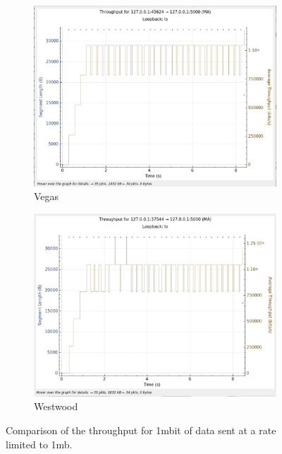 \documentclass{report}
\begin{document}
\begin{figure}[H]
    \begin{subfigure}[b]{0.45\textwidth}
        \centering
        \includegraphics[width=\textwidth]{Pics/Vegas/r1mbit_s1m_th}
        \caption{Vegas}
    \end{subfigure}
    \hfill
    \begin{subfigure}[b]{0.45\textwidth}
        \centering
        \includegraphics[width=\textwidth]{Pics/Westwood/r1mbit_s1m_th}
        \caption{Westwood}
    \end{subfigure}
    \caption{Comparison of the throughput for 1mbit of data sent at a rate limited to 1mb.}
    \label{fig:four_images}
\end{figure}
\end{document}
